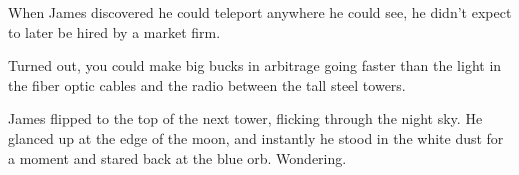 
When James discovered he could teleport anywhere he could see, he didn't
expect to later be hired by a market firm.

Turned out, you could make big bucks in arbitrage going faster than the
light in the fiber optic cables and the radio between the tall steel
towers.

James flipped to the top of the next tower, flicking through the night
sky. He glanced up at the edge of the moon, and instantly he stood in
the white dust for a moment and stared back at the blue orb. Wondering.
